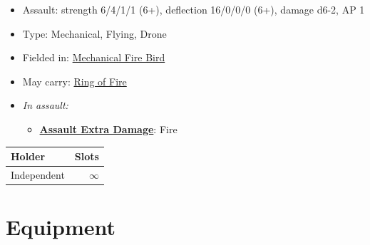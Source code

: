 \documentclass[a4paper,12pt]{article}
\begin{document}
\begin{itemize}
\item Assault: strength 6/4/1/1 (6+), deflection 16/0/0/0 (6+), damage d6-2, AP 1
\item Type: Mechanical, Flying, Drone
\item Fielded in: \hyperref[unit-mechanical-fire-bird]{Mechanical Fire Bird}
\item May carry: \hyperref[equipment-ring-of-fire]{Ring of Fire}



\item \textit{In assault:}
\begin{itemize}
\item \textbf{\hyperref[rule-special-assault-extra-damage]{Assault Extra Damage}}: Fire

\end{itemize}

\end{itemize}

\begin{tabular}{lr}
\textbf{Holder} & \textbf{Slots} \\
\hline
Independent & $\infty$ \\
\end{tabular}
\vspace{1ex}

\newpage
\section{Equipment}
\label{section-equipment}
\end{document}

